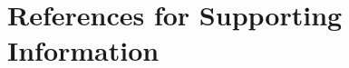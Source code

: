 \documentclass[preprint,review,12pt]{elsarticle}
\begin{document}
	
	
	\newpage
	
	\section*{References for Supporting Information}
	
	
	
	
\end{document}
